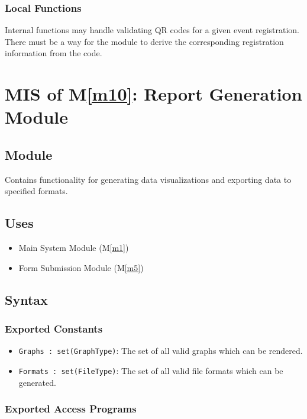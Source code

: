 \documentclass[12pt, titlepage]{article}
\begin{document}
\subsubsection{Local Functions}
Internal functions may handle validating QR codes for a given event registration. There must be a way for the module to
derive the corresponding registration information from the code.

\newpage

\section{MIS of M\ref{m10}: Report Generation Module}

\subsection{Module}
Contains functionality for generating data visualizations and exporting data to specified formats.

\subsection{Uses}

\begin{itemize}
  \item Main System Module (M\ref{m1})
  \item Form Submission Module (M\ref{m5})
\end{itemize}


\subsection{Syntax}

\subsubsection{Exported Constants}

\begin{itemize}
  \item \texttt{Graphs : set(GraphType)}: The set of all valid graphs which can be rendered.
  \item \texttt{Formats : set(FileType)}: The set of all valid file formats which can be generated.
\end{itemize}

\subsubsection{Exported Access Programs}
\end{document}
